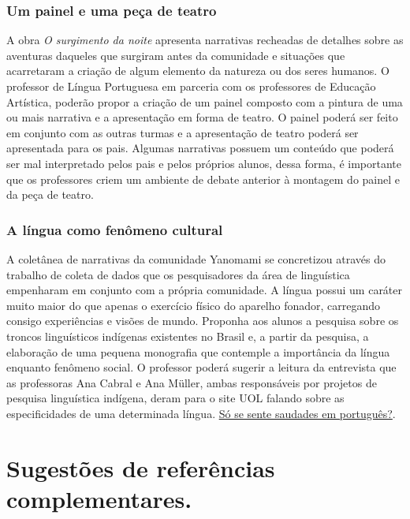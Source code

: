 \documentclass[12pt]{extarticle}
\begin{document}
\subsubsection{Um painel e uma peça de teatro}



  A obra \emph{O surgimento da noite} apresenta narrativas recheadas de
  detalhes sobre as aventuras daqueles que surgiram antes da comunidade
  e situações que acarretaram a criação de algum elemento da natureza ou
  dos seres humanos. O professor de Língua Portuguesa em parceria com os
  professores de Educação Artística, poderão propor a criação de um
  painel composto com a pintura de uma ou mais narrativa e a
  apresentação em forma de teatro. O painel poderá ser feito em conjunto
  com as outras turmas e a apresentação de teatro poderá ser apresentada
  para os pais. Algumas narrativas possuem um conteúdo que poderá ser
  mal interpretado pelos pais e pelos próprios alunos, dessa forma, é
  importante que os professores criem um ambiente de debate anterior à
  montagem do painel e da peça de teatro.

\subsubsection{A língua como fenômeno cultural}


  A coletânea de narrativas da comunidade Yanomami se concretizou
  através do trabalho de coleta de dados que os pesquisadores da área de
  linguística empenharam em conjunto com a própria comunidade. A língua
  possui um caráter muito maior do que apenas o exercício físico do
  aparelho fonador, carregando consigo experiências e visões de mundo.
  Proponha aos alunos a pesquisa sobre os troncos linguísticos indígenas
  existentes no Brasil e, a partir da pesquisa, a elaboração de uma pequena
  monografia que contemple a importância da língua enquanto fenômeno
  social. O professor poderá sugerir a leitura da entrevista que as
  professoras Ana Cabral e Ana Müller, ambas responsáveis por projetos de
  pesquisa linguística indígena, deram para o site UOL falando sobre as
  especificidades de uma determinada língua.
  \href{https://tab.uol.com.br/noticias/redacao/2020/10/11/saudade-ansiedade-aconchego-como-a-lingua-influencia-cultura-e-sensacoes.html}
  {Só se sente saudades em português?}.


\section{Sugestões de referências complementares.}\label{sugestoes}
\end{document}
